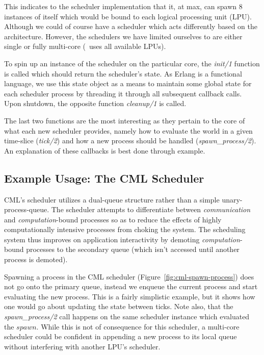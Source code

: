 \noindent
This indicates to the scheduler implementation that it, at max, can spawn $8$
instances of itself which would be bound to each logical processing unit (LPU).
Although we could of course have a scheduler which acts differently based on the
architecture. However, the schedulers we have limited ourselves to are either
single or fully multi-core (\ie~uses all available LPUs).

To spin up an instance of the scheduler on the particular core, the 
\emph{init/1} function is called which should return the scheduler's state. 
As Erlang is a functional language, we use this state object as a means to
maintain some global state for each scheduler process by threading it through
all subsequent callback calls. Upon shutdown, the opposite function 
\emph{cleanup/1} is called.

The last two functions are the most interesting as they pertain to the core of
what each new scheduler provides, namely how to evaluate the world in a given
time-slice (\emph{tick/2}) and how a new process should be handled 
(\emph{spawn\_process/2}). An explanation of these callbacks is best done 
through example.

\subsection{Example Usage: The CML Scheduler}\label{sec:example the cml scheduler}

CML's scheduler utilizes a dual-queue structure rather than
a simple unary-process-queue. The scheduler attempts to differentiate between
{\em communication} and {\em computation}-bound processes so as to reduce the
effects of highly computationally intensive processes from choking the system.
The scheduling system thus improves on application interactivity by demoting 
{\em computation}-bound processes to the secondary queue (which isn't accessed
until another process is demoted).

Spawning a process in the CML scheduler (Figure~\ref{fig:cml-spawn-process}) 
does not go onto the primary queue, instead we enqueue the current process and 
start evaluating the new process. This is a fairly simplistic example, but it 
shows how one would go about updating the state between ticks. Note also, that
the \emph{spawn\_process/2} call happens on the same scheduler instance which
evaluated the $spawn$. While this is not of consequence for this scheduler, a
multi-core scheduler could be confident in appending a new process to its local
queue without interfering with another LPU's scheduler.


